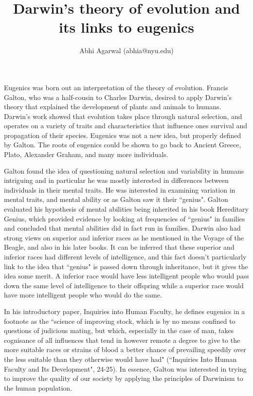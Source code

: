 \documentclass[11pt, oneside]{article}
\title{Darwin's theory of evolution and its links to eugenics}
\author{Abhi Agarwal (abhia@nyu.edu)}
\date{}
\begin{document}
\maketitle

\par 
Eugenics was born out an interpretation of the theory of evolution. Francis Galton, who was a half-cousin to Charles Darwin, desired to apply Darwin's theory that explained the development of plants and animals to humans. Darwin's work showed that evolution takes place through natural selection, and operates on a variety of traits and characteristics that influence ones survival and propagation of their species. Eugenics was not a new idea, but properly defined by Galton. The roots of eugenics could be shown to go back to Ancient Greece, Plato, Alexander Graham, and many more individuals. 

\par Galton found the idea of questioning natural selection and variability in humans intriguing and in particular he was mostly interested in differences between individuals in their mental traits. He was interested in examining variation in mental traits, and mental ability or as Galton saw it their ``genius". Galton evaluated his hypothesis of mental abilities being inherited in his book Hereditary Genius, which provided evidence by looking at frequencies of ``genius" in families and concluded that mental abilities did in fact run in families. Darwin also had strong views on superior and inferior races as he mentioned in the Voyage of the Beagle, and also in his later books. It can be inferred that these superior and inferior races had different levels of intelligence, and this fact doesn't particularly link to the idea that ``genius" is passed down through inheritance, but it gives the idea some merit. A inferior race would have less intelligent people who would pass down the same level of intelligence to their offspring while a superior race would have more intelligent people who would do the same. 

In his introductory paper, Inquiries into Human Faculty, he defines eugenics in a footnote as the ``science of improving stock, which is by no means confined to questions of judicious mating, but which, especially in the case of man, takes cognisance of all influences that tend in however remote a degree to give to the more suitable races or strains of blood a better chance of prevailing speedily over the less suitable than they otherwise would have had" (``Inquiries Into Human Faculty and Its Development", 24-25). In essence, Galton was interested in trying to improve the quality of our society by applying the principles of Darwinism to the human population. 
\end{document}
